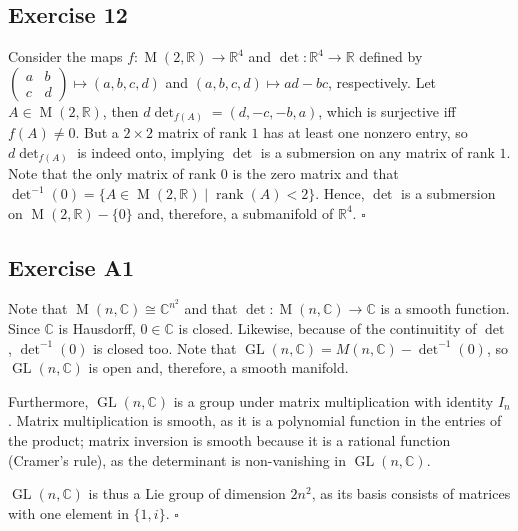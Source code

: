 \documentclass{article}
\newcommand{\R}{\mathbb{R}}
\newcommand{\C}{\mathbb{C}}
\DeclareMathOperator{\M}{M}
\DeclareMathOperator{\GL}{GL}
\begin{document}
\subsection*{Exercise 12}
  Consider the maps $f\colon\M(2,\R)\to\R^4$ and $\det\colon\R^4\to\R$ defined
  by $
  \left(
    \begin{smallmatrix}
      a   &   b\\
      c   &   d
    \end{smallmatrix}
  \right)
  \mapsto(a,b,c,d)$ and $(a,b,c,d)\mapsto ad-bc$, respectively. Let $A\in
  \M(2,\R)$, then $d\det\nolimits_{f(A)}=(d,-c,-b,a)$, which is surjective iff
  $f(A)\ne0$. But a $2\times2$ matrix of rank $1$ has at least one nonzero
  entry, so $d\det_{f(A)}$ is indeed onto, implying $\det$ is a submersion on
  any matrix of rank $1$. Note that the only matrix of rank $0$ is the zero
  matrix and that $\det^{-1}(0)=\{A\in\M(2,\R)\mid\operatorname{rank}(A)<2\}$.
  Hence, $\det$ is a submersion on $\M(2,\R)-\{0\}$ and, therefore, a
  submanifold of $\R^4$.
  \hfill $\square$

\subsection*{Exercise A1}
  Note that $\M(n,\C)\cong\C^{n^2}$ and that $\det\colon\M(n,\C)\to\C$ is a smooth
  function. Since $\C$ is Hausdorff, $0\in\C$ is closed. Likewise, because of
  the continuitity of $\det$, $\det^{-1}(0)$ is closed too. Note that $\GL(n,\C)
  =M(n,\C)-\det^{-1}(0)$, so $\GL(n,\C)$ is open and, therefore, a smooth manifold.

  Furthermore, $\GL(n,\C)$ is a group under matrix multiplication with identity
  $I_n$. Matrix multiplication is smooth, as it is a polynomial function in the
  entries of the product; matrix inversion is smooth because it is a rational
  function (Cramer's rule), as the determinant is non-vanishing in $\GL(n,\C)$.

  $\GL(n,\C)$ is thus a Lie group of dimension $2n^2$, as its basis consists of
  matrices with one element in $\{1,i\}$.
  \hfill $\square$
\end{document}
